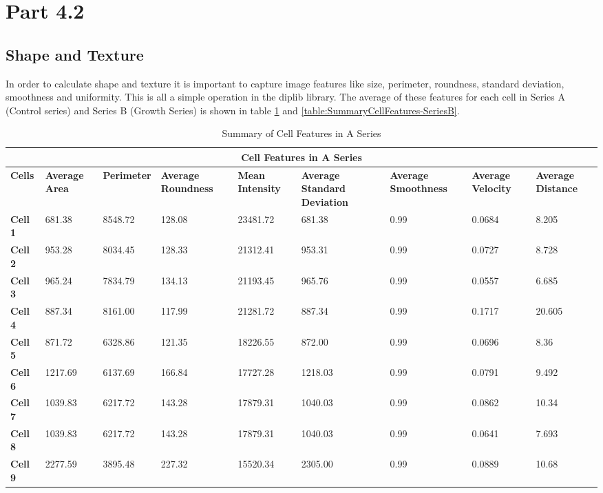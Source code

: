 \documentclass{article}
\begin{document}
\section*{Part 4.2}
\subsection*{Shape and Texture}
In order to calculate shape and texture it is important to capture image features like size, perimeter, roundness, standard deviation, smoothness and uniformity. This is all a simple operation in the diplib library. The average of these features for each cell in Series A (Control series) and Series B (Growth Series) is shown in table \ref{table:SummaryCellFeatures-SeriesA} and \ref{table:SummaryCellFeatures-SeriesB}.

\begin{table}[h!]
\centering
\caption{Summary of Cell Features in A Series}\label{table:SummaryCellFeatures-SeriesA}
\begin{tabular}{|p{1.2cm}|p{1.5cm}|p{1.5cm}|p{1.5cm}|p{1.7cm}|p{1.5cm}|p{1.7cm}|p{1.5cm}|p{1.7cm}|}
\hline
\multicolumn{9}{|c|}{\textbf{Cell Features in A Series}} \\
\hline
\textbf{Cells} & \textbf{Average Area} & \textbf{Perimeter} & \textbf{Average Roundness} & \textbf{Mean Intensity} & \textbf{Average Standard Deviation} & \textbf{Average Smoothness} & \textbf{Average Velocity} & \textbf{Average Distance} \\
\hline
\textbf{Cell 1} & 681.38 & 8548.72 & 128.08 & 23481.72 & 681.38 & 0.99 & 0.0684 & 8.205 \\
\textbf{Cell 2} & 953.28 & 8034.45 & 128.33 & 21312.41 & 953.31 & 0.99 & 0.0727 & 8.728 \\
\textbf{Cell 3} & 965.24 & 7834.79 & 134.13 & 21193.45 & 965.76 & 0.99 & 0.0557 & 6.685 \\
\textbf{Cell 4} & 887.34 & 8161.00 & 117.99 & 21281.72 & 887.34 & 0.99 & 0.1717 & 20.605 \\
\textbf{Cell 5} & 871.72 & 6328.86 & 121.35 & 18226.55 & 872.00 & 0.99 & 0.0696 & 8.36 \\
\textbf{Cell 6} & 1217.69 & 6137.69 & 166.84 & 17727.28 & 1218.03 & 0.99 & 0.0791 & 9.492 \\
\textbf{Cell 7} & 1039.83 & 6217.72 & 143.28 & 17879.31 & 1040.03 & 0.99 & 0.0862 & 10.34 \\
\textbf{Cell 8} & 1039.83 & 6217.72 & 143.28 & 17879.31 & 1040.03 & 0.99 & 0.0641 & 7.693 \\
\textbf{Cell 9} & 2277.59 & 3895.48 & 227.32 & 15520.34 & 2305.00 & 0.99 & 0.0889 & 10.68 \\

\end{tabular}
\end{table}
\end{document}
